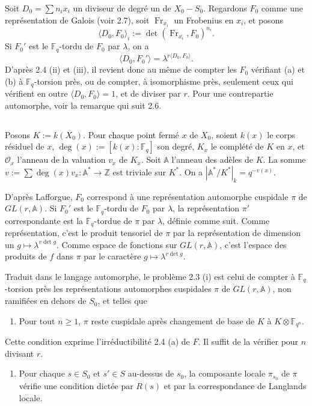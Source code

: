 \documentclass[11pt,a4paper]{article}
\theoremstyle{plain}
\theoremstyle{definition}
\DeclareMathOperator{\Fr}{Fr}
\newcommand{\Z}{\mathbb{Z}}
\newcommand{\F}{\mathbb{F}}
\begin{document}
Soit $D_0 = \sum n_i x_i$ un diviseur de degr\'e un de $X_0 - S_0$. Regardons $F_0$ comme une repr\'esentation de Galois (voir 2.7), soit $\Fr_{x_i}$ un Frobenius en $x_i$, et posons
\[
\langle D_0, F_0 \rangle_i := \det(\Fr_{x_i}, F_0)^{n_i}.
\]
Si $F_0'$ est le $\F_q$-tordu de $F_0$ par $\lambda$, on a
\[
\langle D_0, F_0' \rangle = \lambda^{r \langle D_0, F_0 \rangle}.
\]
D'apr\`es 2.4 (ii) et (iii), il revient donc au m\^eme de compter les $F_0$ v\'erifiant (a) et (b) \`a $\F_q$-torsion pr\`es, ou de compter, \`a isomorphisme pr\`es, seulement ceux qui v\'erifient en outre $\langle D_0, F_0 \rangle = 1$, et de diviser par $r$. Pour une contrepartie automorphe, voir la remarque qui suit 2.6.

\subsection{}
Posons $K := k(X_0)$. Pour chaque point ferm\'e $x$ de $X_0$, soient $k(x)$ le corps r\'esiduel de $x$, $\deg(x) := [k(x): \F_q]$ son degr\'e, $K_x$ le compl\'et\'e de $K$ en $x$, et $\mathcal{O}_x$ l'anneau de la valuation $v_x$ de $K_x$. Soit $\mathbb{A}$ l'anneau des ad\`eles de $K$. La somme $v := \sum \deg(x) v_x: \mathbb{A}^* \to \Z$ est triviale sur $K^*$. On a $|\mathbb{A}^*/K^*|_k = q^{-v(x)}$.

D'apr\`es Lafforgue, $F_0$ correspond \`a une repr\'esentation automorphe cuspidale $\pi$ de $GL(r, \mathbb{A})$. Si $F_0'$ est le $\F_q$-tordu de $F_0$ par $\lambda$, la repr\'esentation $\pi'$ correspondante est la $\F_q$-tordue de $\pi$ par $\lambda$, d\'efinie comme suit. Comme repr\'esentation, c'est le produit tensoriel de $\pi$ par la repr\'esentation de dimension un $g \mapsto \lambda^{v \det g}$. Comme espace de fonctions sur $GL(r, \mathbb{A})$, c'est l'espace des produits de $f$ dans $\pi$ par le caract\`ere $g \mapsto \lambda^{v \det g}$.

Traduit dans le langage automorphe, le probl\`eme 2.3 (i) est celui de compter \`a $\F_q$-torsion pr\`es les repr\'esentations automorphes cuspidales $\pi$ de $GL(r, \mathbb{A})$, non ramifi\'ees en dehors de $S_0$, et telles que
\begin{enumerate}[label=(\alph*$'$)]
\item Pour tout $n \geq 1$, $\pi$ reste cuspidale apr\`es changement de base de $K$ \`a $K \otimes \F_{q^n}$.
\end{enumerate}
Cette condition exprime l'irr\'eductibilit\'e 2.4 (a) de $F$. Il suffit de la v\'erifier pour $n$ divisant $r$.
\begin{enumerate}[label=(\alph*$'$),start=2]
\item Pour chaque $s \in S_0$ et $s' \in S$ au-dessus de $s_0$, la composante locale $\pi_{s_0}$ de $\pi$ v\'erifie une condition dict\'ee par $R(s)$ et par la correspondance de Langlands locale.
\end{enumerate}
\end{document}
